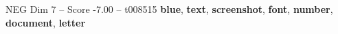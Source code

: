 \begin{textsample}{NEG Dim 7 – Score -7.00 – t008515}  \label{ex:f7_neg_019}
\textbf{blue}, \textbf{text}, \textbf{screenshot}, \textbf{font}, \textbf{number}, \textbf{document}, \textbf{letter}

\end{textsample}
